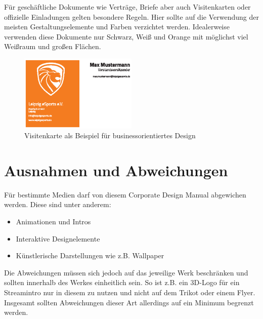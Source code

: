 \documentclass{article}
\begin{document}
Für geschäftliche Dokumente wie Verträge, Briefe aber auch Visitenkarten oder offizielle Einladungen gelten besondere Regeln.
Hier sollte auf die Verwendung der meisten Gestaltungselemente und Farben verzichtet werden.
Idealerweise verwenden diese Dokumente nur Schwarz, Weiß und Orange mit möglichst viel Weißraum und großen Flächen.

\begin{figure}[H]
\begin{center}
\includegraphics[width=0.5\textwidth]{Docs/Visitenkarte.eps}
\end{center}
\caption{Visitenkarte als Beispiel für businessorientiertes Design}
\end{figure}

\cleardoublepage
\section{Ausnahmen und Abweichungen}

Für bestimmte Medien darf von diesem Corporate Design Manual abgewichen werden.
Diese sind unter anderem:

\begin{itemize}
\item Animationen und Intros
\item Interaktive Designelemente
\item Künstlerische Darstellungen wie z.B. Wallpaper
\end{itemize}

Die Abweichungen müssen sich jedoch auf das jeweilige Werk beschränken und sollten innerhalb des Werkes einheitlich sein.
So ist z.B. ein 3D-Logo für ein Streamintro nur in diesem zu nutzen und nicht auf dem Trikot oder einem Flyer.
Insgesamt sollten Abweichungen dieser Art allerdings auf ein Minimum begrenzt werden.
\end{document}

